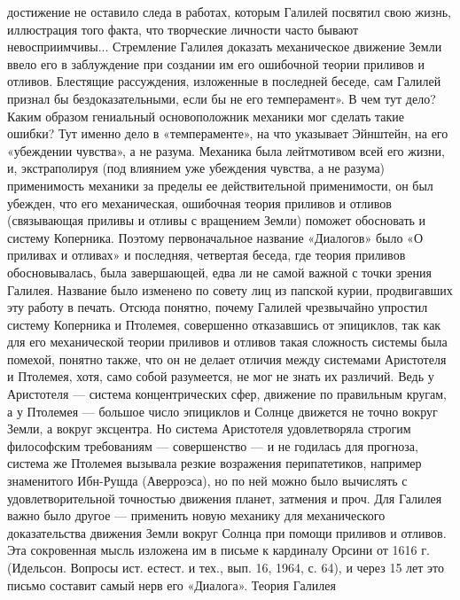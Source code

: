 достижение не оставило следа в  работах, которым Галилей посвятил свою
жизнь, иллюстрация  того факта,  что творческие личности  часто бывают
невосприимчивы...  Стремление Галилея  доказать механическое  движение
Земли ввело  его в  заблуждение при создании  им его  ошибочной теории
приливов  и отливов.  Блестящие  рассуждения,  изложенные в  последней
беседе,  сам Галилей  признал  бы бездоказательными,  если  бы не  его
темперамент». В чем тут  дело? Каким образом гениальный основоположник
механики мог сделать  такие ошибки? Тут именно  дело в «темпераменте»,
на что  указывает Эйнштейн, на  его «убеждении чувства», а  не разума.
Механика  была  лейтмотивом  всей  его жизни,  и,  экстраполируя  (под
влиянием уже убеждения чувства, а  не разума) применимость механики за
пределы  ее  действительной  применимости,  он был  убежден,  что  его
механическая, ошибочная теория приливов и отливов (связывающая приливы
и отливы  с вращением Земли)  поможет обосновать и  систему Коперника.
Поэтому первоначальное название «Диалогов» было «О приливах и отливах»
и  последняя, четвертая  беседа, где  теория приливов  обосновывалась,
была  завершающей, едва  ли не  самой важной  с точки  зрения Галилея.
Название было  изменено по совету  лиц из папской  курии, продвигавших
эту  работу  в  печать.  Отсюда понятно,  почему  Галилей  чрезвычайно
упростил  систему  Коперника  и Птолемея,  совершенно  отказавшись  от
эпициклов,  так как  для его  механической теории  приливов и  отливов
такая  сложность  системы  была  помехой, понятно  также,  что  он  не
делает  отличия  между системами  Аристотеля  и  Птолемея, хотя,  само
собой  разумеется, не  мог не  знать  их различий.  Ведь у  Аристотеля
---  система  концентрических  сфер, движение  по  правильным  кругам,
а  у  Птолемея  ---  большое  число эпициклов  и  Солнце  движется  не
точно  вокруг  Земли,  а   вокруг  эксцентра.  Но  система  Аристотеля
удовлетворяла  строгим философским  требованиям  --- совершенство  ---
и  не  годилась для  прогноза,  система  же Птолемея  вызывала  резкие
возражения перипатетиков, например  знаменитого Ибн-Рушда (Аверроэса),
но  по  ней  можно   было  вычислять  с  удовлетворительной  точностью
движения планет,  затмения и проч.  Для Галилея важно было  другое ---
применить  новую механику  для  механического доказательства  движения
Земли вокруг  Солнца при  помощи приливов  и отливов.  Эта сокровенная
мысль изложена  им в письме к  кардиналу Орсини от 1616  г. (Идельсон.
Вопросы  ист. естест.  и  тех., вып.  16,  1964, с.  64),  и через  15
лет  это письмо  составит  самый нерв  его  «Диалога». Теория  Галилея
